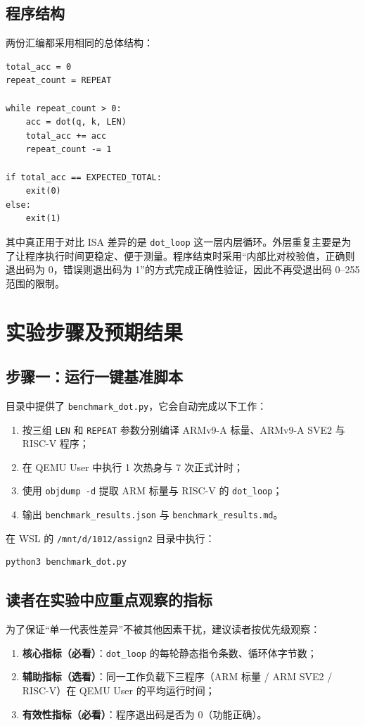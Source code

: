 \documentclass{article}
\begin{document}
\subsection{程序结构}
两份汇编都采用相同的总体结构：
\begin{Verbatim}[frame=single]
total_acc = 0
repeat_count = REPEAT

while repeat_count > 0:
    acc = dot(q, k, LEN)
    total_acc += acc
    repeat_count -= 1

if total_acc == EXPECTED_TOTAL:
    exit(0)
else:
    exit(1)
\end{Verbatim}

其中真正用于对比 ISA 差异的是 \texttt{dot\_loop} 这一层内层循环。外层重复主要是为了让程序执行时间更稳定、便于测量。程序结束时采用“内部比对校验值，正确则退出码为 0，错误则退出码为 1”的方式完成正确性验证，因此不再受退出码 0--255 范围的限制。

\section{实验步骤及预期结果}
\subsection{步骤一：运行一键基准脚本}
目录中提供了 \texttt{benchmark\_dot.py}，它会自动完成以下工作：
\begin{enumerate}
    \item 按三组 \texttt{LEN} 和 \texttt{REPEAT} 参数分别编译 ARMv9-A 标量、ARMv9-A SVE2 与 RISC-V 程序；
    \item 在 QEMU User 中执行 1 次热身与 7 次正式计时；
    \item 使用 \texttt{objdump -d} 提取 ARM 标量与 RISC-V 的 \texttt{dot\_loop}；
    \item 输出 \texttt{benchmark\_results.json} 与 \texttt{benchmark\_results.md}。
\end{enumerate}

在 WSL 的 \texttt{/mnt/d/1012/assign2} 目录中执行：
\begin{Verbatim}[frame=single]
python3 benchmark_dot.py
\end{Verbatim}

\subsection{读者在实验中应重点观察的指标}
为了保证“单一代表性差异”不被其他因素干扰，建议读者按优先级观察：
\begin{enumerate}
    \item \textbf{核心指标（必看）}：\texttt{dot\_loop} 的每轮静态指令条数、循环体字节数；
    \item \textbf{辅助指标（选看）}：同一工作负载下三程序（ARM 标量 / ARM SVE2 / RISC-V）在 QEMU User 的平均运行时间；
    \item \textbf{有效性指标（必看）}：程序退出码是否为 0（功能正确）。
\end{enumerate}
\end{document}
